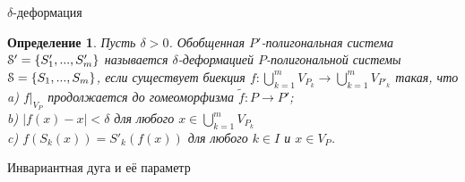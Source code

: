 \documentclass[aspectratio=1610, 10pt, notheorems]{beamer}
\newtheorem{lemma}       {Лемма}
\newtheorem{definition}  {Определение}
\begin{document}
\begin{frame}{$\delta$-деформация}
\begin{definition}
Пусть $\delta>0$. 
Обобщенная $P'$-полигональная система ${\EuScript S}'=\{S'_1,...,S'_m\}$ называется $\delta$-деформацией $P$-полигональной системы ${\EuScript S}=\{S_1,...,S_m\}$, если существует биекция $f:\bigcup\limits_{k=1}^m V_{P_k}\to \bigcup\limits_{k=1}^m V_{P'_k}$ такая, что\\
a) $f|_{V_P}$ продолжается до гомеоморфизма $\tilde f: P\to  P'$; \\ 
b) $|f(x)-x|<\delta$  для любого $x\in \bigcup\limits_{k=1}^m V_{P_k}$\\  
c) $f(S_k(x))=S'_k(f(x))$ для любого $k\in I$ и $x\in V_P$.
\end{definition}
\end{frame}


\begin{frame}{Инвариантная дуга и её параметр}

\end{frame}

%
%
\end{document}
